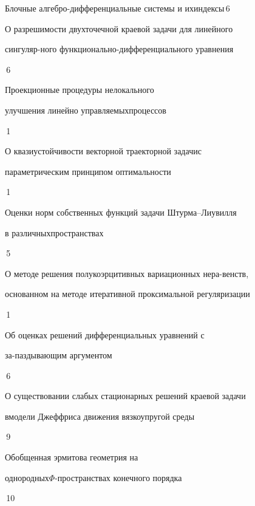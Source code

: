 

{Блочные алгебро-дифференциальные системы и их\newline индексы}{\No\,6}




{О разрешимости двухточечной краевой задачи для линейного


сингуляр-\newline ного функционально-дифференциального уравнения}{\No\,6}




{Проекционные процедуры нелокального 


улучшения линейно управляемых\newline процессов}{\No\,1}




{О квазиустойчивости векторной траекторной задачи\newline с


параметрическим принципом оптимальности}{\No\,1}




{Оценки норм собственных функций задачи Штурма--Лиувилля  


в различных\newline пространствах}{\No\,5}










{О методе решения полукоэрцитивных вариационных нера-\newline венств,


основанном на методе итеративной проксимальной регуляризации}{\No\,1}




{Об оценках решений дифференциальных уравнений с


за-\newline паздывающим аргументом}{\No\,6}




{О существовании слабых стационарных решений краевой задачи


в\newline модели Джеффриса движения вязкоупругой среды}{\No\,9}




{Обобщенная эрмитова геометрия на


однородных\newline $\Phi$-пространствах конечного порядка}{\No\,10}








